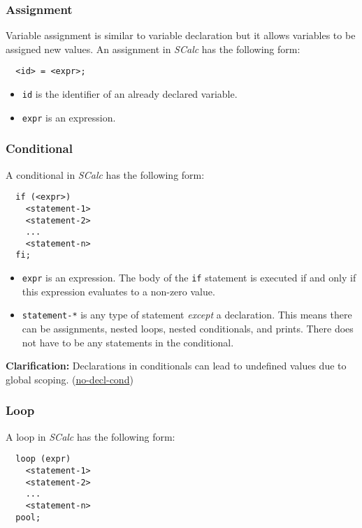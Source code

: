 \documentclass{article}
\newcommand{\code}[1]{\texttt{\textmd{#1}}}
\newcommand{\clarification}[2]{\textbf{Clarification: }#1 (\hyperlink{#2}{#2})}
\begin{document}
\subsubsection{Assignment}
\label{sssec:assignment}
Variable assignment is similar to variable declaration but it allows variables to be assigned new
values. An assignment in \textit{SCalc} has the following form:
\begin{lstlisting}
  <id> = <expr>;
\end{lstlisting}

\begin{itemize}
  \item \code{id} is the identifier of an already declared variable.
  \item \code{expr} is an expression.
\end{itemize}

\subsubsection{Conditional}
\label{sssec:conditional}
A conditional in \textit{SCalc} has the following form:
\begin{lstlisting}
  if (<expr>)
    <statement-1>
    <statement-2>
    ...
    <statement-n>
  fi;
\end{lstlisting}

\begin {itemize}
  \item
    \code{expr} is an expression. The body of the \code{if} statement is executed if and only if
    this expression evaluates to a non-zero value.
  \item
    \code{statement-*} is any type of statement \textit{except} a declaration. This means there can
    be assignments, nested loops, nested conditionals, and prints. There does not have to be any
    statements in the conditional.
\end{itemize}

\clarification{Declarations in conditionals can lead to undefined values due to global scoping.}
{no-decl-cond}

\subsubsection{Loop}
\label{sssec:loop}
A loop in \textit{SCalc} has the following form:
\begin{lstlisting}
  loop (expr)
    <statement-1>
    <statement-2>
    ...
    <statement-n>
  pool;
\end{lstlisting}
\end{document}
